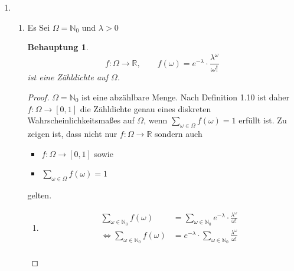 \documentclass[a4paper]{scrartcl}
\newtheorem*{behaupt}{Behauptung}
\newcommand{\gdw}{\Leftrightarrow}
\begin{document}
\begin{enumerate}[label=\bfseries\arabic*.]
    \item
        \begin{enumerate}[label=(\alph*)]
            \item
                Es Sei $\Omega = \mathbb{N}_0$ und $\lambda > 0$
                \begin{behaupt}
                    \begin{equation*}
                        f\colon \Omega \to \mathbb{R}, \qquad
                        f(\omega)
                        = e^{-\lambda} \cdot \frac{\lambda^\omega}{\omega!}
                    \end{equation*}
                    ist eine Zähldichte auf $\Omega$.
                \end{behaupt}
                \begin{proof}
                    $\Omega = \mathbb{N}_0$ ist eine abzählbare Menge.
                    Nach Definition 1.10 ist daher $f\colon \Omega \to [0,1]$ die
                    Zähldichte genau eines diskreten Wahrscheinlichkeitsmaßes
                    auf $\Omega$, wenn
                    $\sum\limits_{\omega \in \Omega} f(\omega) = 1$ erfüllt ist.
                    Zu zeigen ist, dass nicht nur
                    $f\colon \Omega \to \mathbb{R}$ sondern auch
                    \begin{itemize}
                        \item $f\colon \Omega \to [0,1]$ sowie
                        \item $\sum\limits_{\omega \in \Omega} f(\omega) = 1$
                    \end{itemize}
                    gelten.
                    \begin{enumerate}
                        \item
                            \begin{equation*}
                                \begin{split}
                                    \sum_{\omega \in \mathbb{N}_0} f(\omega)
                                    &= \sum_{\omega \in \mathbb{N}_0}
                                        e^{-\lambda} \cdot
                                        \frac{\lambda^\omega}{\omega!} \\
                                    \gdw
                                    \sum_{\omega \in \mathbb{N}_0} f(\omega)
                                    &= e^{-\lambda}
                                        \cdot \sum_{\omega \in \mathbb{N}_0}
                                        \frac{\lambda^\omega}{\omega!} \\

\end{split}
\end{equation*}
\end{enumerate}
\end{proof}
\end{enumerate}
\end{enumerate}
\end{document}
